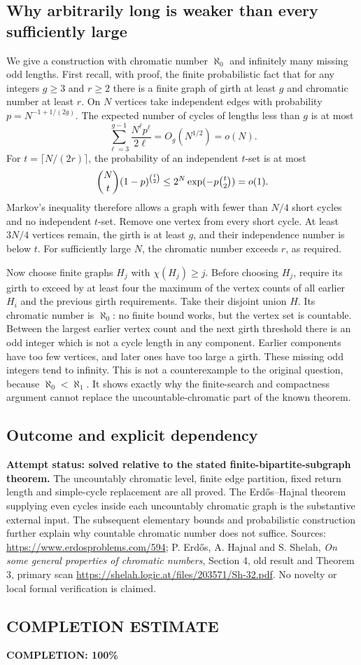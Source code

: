 \subsection*{Why arbitrarily long is weaker than every sufficiently large}
We give a construction with chromatic number $\aleph_0$ and infinitely many missing odd lengths. First recall, with proof, the finite probabilistic fact that for any integers $g\geq3$ and $r\geq2$ there is a finite graph of girth at least $g$ and chromatic number at least $r$.
On $N$ vertices take independent edges with probability $p=N^{-1+1/(2g)}$. The expected number of cycles of lengths less than $g$ is at most
\[\sum_{\ell=3}^{g-1}\frac{N^\ell p^\ell}{2\ell}=O_g(N^{1/2})=o(N).
\]
For $t=\lceil N/(2r)\rceil$, the probability of an independent $t$-set is at most
\[\binom Nt(1-p)^{\binom t2}
\leq 2^N\exp(-p\tbinom t2)=o(1).
\]
Markov's inequality therefore allows a graph with fewer than $N/4$ short cycles and no independent $t$-set. Remove one vertex from every short cycle. At least $3N/4$ vertices remain, the girth is at least $g$, and their independence number is below $t$. For sufficiently large $N$, the chromatic number exceeds $r$, as required.

Now choose finite graphs $H_j$ with $\chi(H_j)\geq j$. Before choosing $H_j$, require its girth to exceed by at least four the maximum of the vertex counts of all earlier $H_i$ and the previous girth requirements. Take their disjoint union $H$. Its chromatic number is $\aleph_0$: no finite bound works, but the vertex set is countable. Between the largest earlier vertex count and the next girth threshold there is an odd integer which is not a cycle length in any component. Earlier components have too few vertices, and later ones have too large a girth. These missing odd integers tend to infinity.
This is not a counterexample to the original question, because $\aleph_0<\aleph_1$. It shows exactly why the finite-search and compactness argument cannot replace the uncountable-chromatic part of the known theorem.

\subsection*{Outcome and explicit dependency}
\textbf{Attempt status: solved relative to the stated finite-bipartite-subgraph theorem.} The uncountably chromatic level, finite edge partition, fixed return length and simple-cycle replacement are all proved. The Erd\H{o}s--Hajnal theorem supplying even cycles inside each uncountably chromatic graph is the substantive external input. The subsequent elementary bounds and probabilistic construction further explain why countable chromatic number does not suffice.
Sources: \url{https://www.erdosproblems.com/594}; P. Erd\H{o}s, A. Hajnal and S. Shelah, \emph{On some general properties of chromatic numbers}, Section 4, old result and Theorem 3, primary scan \url{https://shelah.logic.at/files/203571/Sh-32.pdf}. No novelty or local formal verification is claimed.

\subsection*{COMPLETION ESTIMATE}
\textbf{COMPLETION: 100\%}
